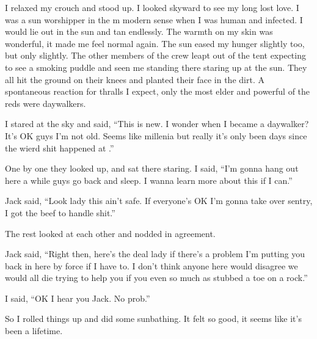 I relaxed my crouch and stood up. I looked skyward to see my long lost love. I was a sun worshipper in the m modern sense when I was human and infected. I would lie out in the sun and tan endlessly. The warmth on my skin was wonderful, it made me feel normal again. The sun eased my hunger slightly too, but only slightly. The other members of the crew leapt out of the tent expecting to see a smoking puddle and seen me standing there staring up at the sun. They all hit the ground on their knees and planted their face in the dirt. A spontaneous reaction for thralls I expect, only the most elder and powerful of the reds were daywalkers.

I stared at the sky and said, ``This is new. I wonder when I became a daywalker? It's OK guys I'm not old. Seems like millenia but really it's only been days since the wierd shit happened at \chichenitza*.''

One by one they looked up, and sat there staring. I said, ``I'm gonna hang out here a while guys go back and sleep. I wanna learn more about this if I can.''

Jack said, ``Look lady this ain't safe. If everyone's OK I'm gonna take over sentry, I got the beef to handle shit.''

The rest looked at each other and nodded in agreement.

Jack said, ``Right then, here's the deal lady if there's a problem I'm putting you back in here by force if I have to. I don't think anyone here would disagree we would all die trying to help you if you even so much as stubbed a toe on a rock.''

I said, ``OK I hear you Jack. No prob.''

So I rolled things up and did some sunbathing. It felt so good, it seems like it's been a lifetime.

